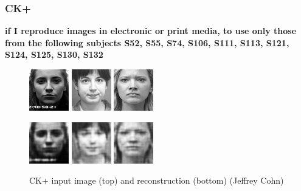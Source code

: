 \documentclass[draft]{article}
\begin{document}
    \subsubsection{CK+}
    \textbf{if I reproduce images in electronic or print media, to use only those from the following subjects 
S52, S55, S74, S106, S111, S113, S121, S124, S125, S130, S132} \\
      \begin{figure}[h]
        \centering
        \includegraphics[width=0.2\linewidth]{../graphics/reconstructions/ckplus/input_00.png}
        \includegraphics[width=0.2\linewidth]{../graphics/reconstructions/ckplus/input_01.png}
        \includegraphics[width=0.2\linewidth]{../graphics/reconstructions/ckplus/input_02.png}

        \includegraphics[width=0.2\linewidth]{../graphics/reconstructions/ckplus/reconstruction_00.png}
        \includegraphics[width=0.2\linewidth]{../graphics/reconstructions/ckplus/reconstruction_01.png}
        \includegraphics[width=0.2\linewidth]{../graphics/reconstructions/ckplus/reconstruction_02.png}

        \caption{CK+ input image (top) and reconstruction (bottom) ({\textcopyright}Jeffrey Cohn)}
      \end{figure}
\end{document}
